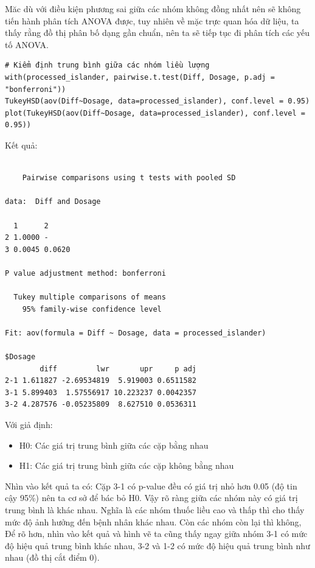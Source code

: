 \begin{itemize}
Măc dù với điều kiện phương sai giữa các nhóm không đồng nhất nên sẽ không tiến hành phân tích ANOVA được, tuy nhiên về mặc trực quan hóa dữ liệu, ta thấy rằng đồ thị phân bố dạng gần chuẩn, nên ta sẽ tiếp tục đi phân tích các yếu tố ANOVA.
\newpage

    \begin{lstlisting}
# Kiểm định trung bình giữa các nhóm liều lượng
with(processed_islander, pairwise.t.test(Diff, Dosage, p.adj = "bonferroni"))
TukeyHSD(aov(Diff~Dosage, data=processed_islander), conf.level = 0.95)
plot(TukeyHSD(aov(Diff~Dosage, data=processed_islander), conf.level = 0.95))
    \end{lstlisting}
    Kết quả:
    \begin{lstlisting}

	Pairwise comparisons using t tests with pooled SD 

data:  Diff and Dosage 

  1      2     
2 1.0000 -     
3 0.0045 0.0620

P value adjustment method: bonferroni 

  Tukey multiple comparisons of means
    95% family-wise confidence level

Fit: aov(formula = Diff ~ Dosage, data = processed_islander)

$Dosage
        diff         lwr       upr     p adj
2-1 1.611827 -2.69534819  5.919003 0.6511582
3-1 5.899403  1.57556917 10.223237 0.0042357
3-2 4.287576 -0.05235809  8.627510 0.0536311        
    \end{lstlisting}
    Với giả định:
    \begin{itemize}
        \item H0: Các giá trị trung bình giữa các cặp bằng nhau
        \item H1: Các giá trị trung bình giữa các cặp không bằng nhau
    \end{itemize}
    Nhìn vào kết quả ta có: Cặp 3-1 có p-value đều có giá trị nhỏ hơn 0.05 (độ tin cậy 95\%) nên ta cơ sở để bác bỏ H0. Vậy rõ ràng giữa các nhóm này có giá trị trung bình là khác nhau. Nghĩa là các nhóm thuốc liều cao và thấp thì cho thấy mức độ ảnh hưởng đến bệnh nhân khác nhau. Còn các nhóm còn lại thì không, Để rõ hơn, nhìn vào kết quả và hình vẽ ta cũng thấy ngay giữa nhóm 3-1 có mức độ hiệu quả trung bình khác nhau, 3-2 và 1-2 có mức độ hiệu quả trung bình như nhau (đồ thị cắt điểm 0).


\end{itemize}
